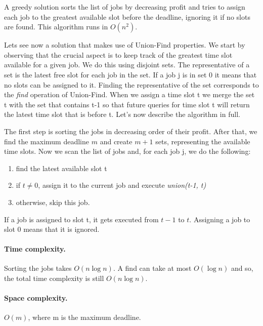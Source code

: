 \documentclass{article}
\begin{document}
\bigskip
A greedy solution \cite{key} sorts the list of jobs by decreasing profit and tries to assign each job to the greatest available slot before the deadline, ignoring it if no slots
are found. This algorithm runs in $O(n^2)$.

\medskip

Lets see now a solution that makes use of Union-Find properties. We start by observing that the crucial aspect
is to keep track of the greatest time slot available for a given job. We do this using disjoint sets. The  representative of a set
is the latest free slot for each job in the set. If a job j is in set 0 it means that no slots can be assigned to it. Finding the representative
of the set corresponds to the \emph{find} operation of Union-Find. When we assign a time slot t
we merge the set t with the set that contains t-1 so that future queries for time slot t will return the latest time slot that is before t. Let's now describe the algorithm in full.

\medskip

The first step is sorting the jobs in decreasing order of their profit. After that, we find the maximum deadline $m$ and create $m+1$ sets, representing the available time slots.
 Now we scan the list  of jobs and, for each job j,
we do the following:\begin{enumerate}
    \item find the latest available slot t
    \item if $t \neq 0$, assign it to the current job and
    execute \emph{union(t-1, t)}
    \item otherwise, skip this job.
\end{enumerate}
If a job is assigned to slot t, it gets executed from $t-1$ to $t$. Assigning a job to slot 0 means that it is ignored.
\paragraph{Time complexity.} Sorting the jobs takes $O(n \log n)$.
A find can take at most $O(\log n)$ and so, the total time complexity is still $O(n\log n)$.
\paragraph{Space complexity.} $O(m)$, where m is the maximum deadline.



\end{document}
